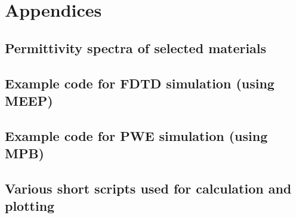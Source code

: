 \documentclass[letterpaper,12pt]{report}
\begin{document}
\chapter{Appendices}
	\section{Permittivity spectra of selected materials}
	\section{Example code for FDTD simulation (using MEEP)}
	\section{Example code for PWE simulation (using MPB)}
	\section{Various short scripts used for calculation and plotting}
\label{endtext} 


\end{document}
